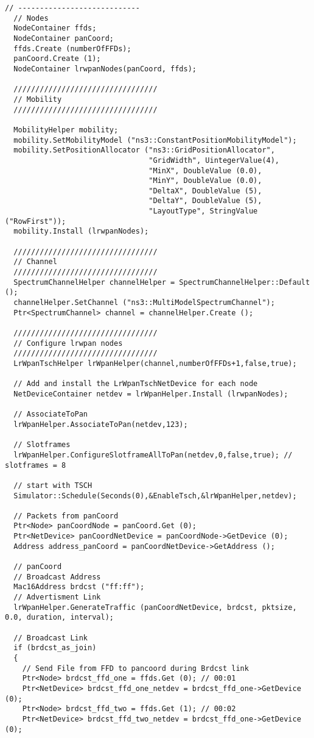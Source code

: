 \begin{lstlisting}[frame=single]
  // ----------------------------
  // Nodes
  NodeContainer ffds;
  NodeContainer panCoord;
  ffds.Create (numberOfFFDs);
  panCoord.Create (1);
  NodeContainer lrwpanNodes(panCoord, ffds);

  /////////////////////////////////
  // Mobility
  /////////////////////////////////

  MobilityHelper mobility;
  mobility.SetMobilityModel ("ns3::ConstantPositionMobilityModel");
  mobility.SetPositionAllocator ("ns3::GridPositionAllocator",
                                 "GridWidth", UintegerValue(4),
                                 "MinX", DoubleValue (0.0),
                                 "MinY", DoubleValue (0.0),
                                 "DeltaX", DoubleValue (5),
                                 "DeltaY", DoubleValue (5),
                                 "LayoutType", StringValue ("RowFirst"));
  mobility.Install (lrwpanNodes);

  /////////////////////////////////
  // Channel
  /////////////////////////////////
  SpectrumChannelHelper channelHelper = SpectrumChannelHelper::Default ();
  channelHelper.SetChannel ("ns3::MultiModelSpectrumChannel");
  Ptr<SpectrumChannel> channel = channelHelper.Create ();

  /////////////////////////////////
  // Configure lrwpan nodes
  /////////////////////////////////
  LrWpanTschHelper lrWpanHelper(channel,numberOfFFDs+1,false,true);

  // Add and install the LrWpanTschNetDevice for each node
  NetDeviceContainer netdev = lrWpanHelper.Install (lrwpanNodes);

  // AssociateToPan
  lrWpanHelper.AssociateToPan(netdev,123);

  // Slotframes
  lrWpanHelper.ConfigureSlotframeAllToPan(netdev,0,false,true); // slotframes = 8

  // start with TSCH
  Simulator::Schedule(Seconds(0),&EnableTsch,&lrWpanHelper,netdev);

  // Packets from panCoord
  Ptr<Node> panCoordNode = panCoord.Get (0);
  Ptr<NetDevice> panCoordNetDevice = panCoordNode->GetDevice (0);
  Address address_panCoord = panCoordNetDevice->GetAddress ();

  // panCoord
  // Broadcast Address
  Mac16Address brdcst ("ff:ff");
  // Advertisment Link
  lrWpanHelper.GenerateTraffic (panCoordNetDevice, brdcst, pktsize, 0.0, duration, interval);

  // Broadcast Link
  if (brdcst_as_join)
  {
    // Send File from FFD to pancoord during Brdcst link
    Ptr<Node> brdcst_ffd_one = ffds.Get (0); // 00:01
    Ptr<NetDevice> brdcst_ffd_one_netdev = brdcst_ffd_one->GetDevice (0);
    Ptr<Node> brdcst_ffd_two = ffds.Get (1); // 00:02
    Ptr<NetDevice> brdcst_ffd_two_netdev = brdcst_ffd_one->GetDevice (0);


\end{lstlisting}
